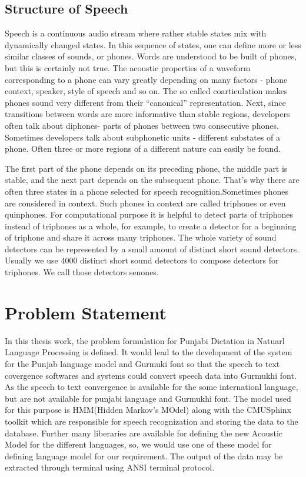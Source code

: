 \documentclass[12pt,a4paper,oldfontcommands]{memoir}
\begin{document}
\subsection{Structure of Speech}
Speech is a continuous audio stream where rather stable states mix with dynamically changed states. In this sequence of states, one can define more or less similar classes of sounds, or phones. Words are understood to be built of phones, but this is certainly not true. The acoustic properties of a waveform corresponding to a phone can vary greatly depending on many factors - phone context, speaker, style of speech and so on. The so called coarticulation makes phones sound very different from their “canonical” representation. Next, since transitions between words are more informative than stable regions, developers often talk about diphones- parts of phones between two consecutive phones. Sometimes developers talk about subphonetic units - different substates of a phone. Often three or more regions of a different nature can easily be found.

The first part of the phone depends on its preceding phone, the middle part is stable, and the next part depends on the subsequent phone. That's why there are often three states in a phone selected for speech recognition.Sometimes phones are considered in context. Such phones in context are called triphones or even quinphones. For computational purpose it is helpful to detect parts of triphones instead of triphones as a whole, for example, to create a detector for a beginning of triphone and share it across many triphones. The whole variety of sound detectors can be represented by a small amount of distinct short sound detectors. Usually we use 4000 distinct short sound detectors to compose detectors for triphones. We call those detectors senones. 

\section{ Problem Statement}

In this thesis work, the problem formulation for Punjabi Dictation in Natuarl Language Processing is defined. It would lead to the development of the system for the Punjab language model and Gurmuki font so that the speech to text covergence softwares and systems could convert speech data into Gurmukhi font. As the speech to text convergence is available for the some internationl language, but are not available for punjabi language and Gurmukhi font. The model used for this purpose is HMM(Hidden Markov’s MOdel) along with the CMUSphinx toolkit which are responsible for speech recognization and storing the data to the database. Further many liberaries are available for defining the new Acoustic Model for the different languages, so, we would use one of these model for defining language model for our requirement. The output of the data may be extracted through terminal using ANSI terminal protocol.
\end{document}
